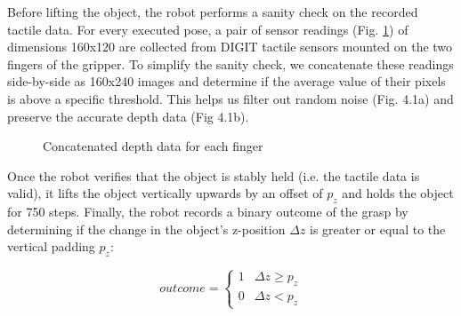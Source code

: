 \documentclass[11pt, a4paper]{report}
\theoremstyle{definition}
\begin{document}
Before lifting the object, the robot performs a sanity check on the recorded tactile data. For every executed pose, a pair of sensor readings (Fig. \ref{fig:1}) of dimensions 160x120 are collected from DIGIT tactile sensors mounted on the two fingers of the gripper. To simplify the sanity check, we concatenate these readings side-by-side as 160x240 images and determine if the average value of their pixels is above a specific threshold. This helps us filter out random noise (Fig. 4.1a) and preserve the accurate depth data (Fig 4.1b).
\begin{figure}[H]%
    \centering
    \qquad
    \caption{Concatenated depth data for each finger}%
    \label{fig:1}%
\end{figure}

Once the robot verifies that the object is stably held (i.e. the tactile data is valid), it lifts the object vertically upwards by an offset of $p_z$ and holds the object for 750 steps. Finally, the robot records a binary outcome of the grasp by determining if the change in the object's z-position $\Delta z$ is greater or equal to the vertical padding $p_z$:

\begin{equation}
    outcome=\begin{cases}1 & \Delta z\geq p_z \\ 0 & \Delta z<p_z\end{cases}
\end{equation}
\end{document}
